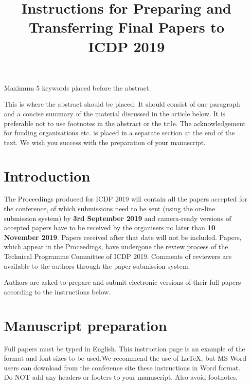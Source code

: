 \documentclass[10pt]{article}
\begin{document}
\noindent



\title{Instructions for Preparing and Transferring Final Papers to \\ICDP 2019}




\maketitle

\keywords
Maximum 5 keywords placed before the abstract.

\abstract
This is where the abstract should be placed. It should consist
of one paragraph and a concise summary of the material
discussed in the article below. It is preferable not to use
footnotes in the abstract or the title. The acknowledgement
for funding organisations etc. is placed in a separate section at
the end of the text. We wish you success with the preparation
of your manuscript.

\section{Introduction}
The Proceedings produced for ICDP 2019 will contain all the
papers accepted for the conference, of which submissions need to be sent (using the on-line submission
system) by \textbf{3rd September 2019} and camera-ready versions
of accepted papers have to be received
by the organisers no later than \textbf{10 November 2019}. Papers
received after that date will not be included. Papers, which
appear in the Proceedings, have undergone the review process
of the Technical Programme Committee of ICDP 2019.
Comments of reviewers are available to the authors through the paper submission system. 

Authors are
asked to prepare and submit electronic versions of their full
papers according to the instructions below.

\section{Manuscript preparation}
Full papers must be typed in English. This instruction page is
an example of the format and font sizes to be used.We recommend the use of LaTeX, but MS Word
users can download from the conference site these
instructions in Word format. Do NOT add any headers or footers to your manuscript. Also avoid footnotes. 
\end{document}
